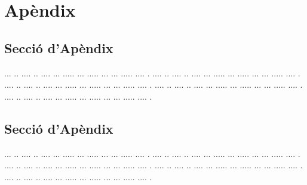 \documentclass[10pt,a4paper,twocolumn,twoside]{article}
\begin{document}




\appendix

\section*{Apèndix}

\setcounter{section}{1}

\subsection{Secció d'Apèndix}


... ..  .... .. .... ... ..... ... ..... ... ... ..... .... .
.... ..  .... .. .... ... ..... ... ..... ... ... ..... .... .
.... ..  .... .. .... ... ..... ... ..... ... ... ..... .... .
.... ..  .... .. .... ... ..... ... ..... ... ... ..... .... .
.... ..  .... .. .... ... ..... ... ..... ... ... ..... .... .

\subsection{Secció d'Apèndix}


... ..  .... .. .... ... ..... ... ..... ... ... ..... .... .
.... ..  .... .. .... ... ..... ... ..... ... ... ..... .... .
.... ..  .... .. .... ... ..... ... ..... ... ... ..... .... .
.... ..  .... .. .... ... ..... ... ..... ... ... ..... .... .
.... ..  .... .. .... ... ..... ... ..... ... ... ..... .... .
\end{document}
